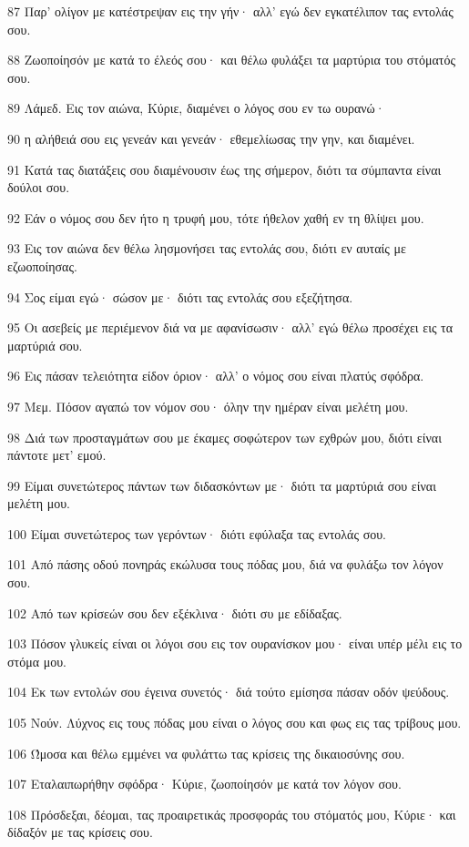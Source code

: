 \par 87 Παρ' ολίγον με κατέστρεψαν εις την γήν· αλλ' εγώ δεν εγκατέλιπον τας εντολάς σου.
\par 88 Ζωοποίησόν με κατά το έλεός σου· και θέλω φυλάξει τα μαρτύρια του στόματός σου.
\par 89 Λάμεδ. Εις τον αιώνα, Κύριε, διαμένει ο λόγος σου εν τω ουρανώ·
\par 90 η αλήθειά σου εις γενεάν και γενεάν· εθεμελίωσας την γην, και διαμένει.
\par 91 Κατά τας διατάξεις σου διαμένουσιν έως της σήμερον, διότι τα σύμπαντα είναι δούλοι σου.
\par 92 Εάν ο νόμος σου δεν ήτο η τρυφή μου, τότε ήθελον χαθή εν τη θλίψει μου.
\par 93 Εις τον αιώνα δεν θέλω λησμονήσει τας εντολάς σου, διότι εν αυταίς με εζωοποίησας.
\par 94 Σος είμαι εγώ· σώσον με· διότι τας εντολάς σου εξεζήτησα.
\par 95 Οι ασεβείς με περιέμενον διά να με αφανίσωσιν· αλλ' εγώ θέλω προσέχει εις τα μαρτύριά σου.
\par 96 Εις πάσαν τελειότητα είδον όριον· αλλ' ο νόμος σου είναι πλατύς σφόδρα.
\par 97 Μεμ. Πόσον αγαπώ τον νόμον σου· όλην την ημέραν είναι μελέτη μου.
\par 98 Διά των προσταγμάτων σου με έκαμες σοφώτερον των εχθρών μου, διότι είναι πάντοτε μετ' εμού.
\par 99 Είμαι συνετώτερος πάντων των διδασκόντων με· διότι τα μαρτύριά σου είναι μελέτη μου.
\par 100 Είμαι συνετώτερος των γερόντων· διότι εφύλαξα τας εντολάς σου.
\par 101 Από πάσης οδού πονηράς εκώλυσα τους πόδας μου, διά να φυλάξω τον λόγον σου.
\par 102 Από των κρίσεών σου δεν εξέκλινα· διότι συ με εδίδαξας.
\par 103 Πόσον γλυκείς είναι οι λόγοι σου εις τον ουρανίσκον μου· είναι υπέρ μέλι εις το στόμα μου.
\par 104 Εκ των εντολών σου έγεινα συνετός· διά τούτο εμίσησα πάσαν οδόν ψεύδους.
\par 105 Νούν. Λύχνος εις τους πόδας μου είναι ο λόγος σου και φως εις τας τρίβους μου.
\par 106 Ώμοσα και θέλω εμμένει να φυλάττω τας κρίσεις της δικαιοσύνης σου.
\par 107 Εταλαιπωρήθην σφόδρα· Κύριε, ζωοποίησόν με κατά τον λόγον σου.
\par 108 Πρόσδεξαι, δέομαι, τας προαιρετικάς προσφοράς του στόματός μου, Κύριε· και δίδαξόν με τας κρίσεις σου.
